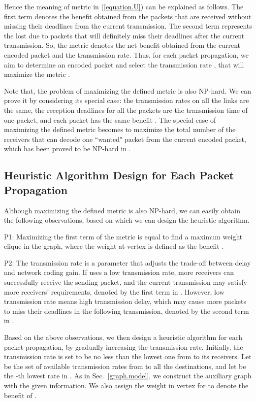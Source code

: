 \documentclass[journal]{IEEEtran}
\begin{document}
Hence the meaning of metric  in (\ref{equation.U}) can be explained as follows.
The first term  denotes the benefit obtained from the packets that are received without missing their deadlines from the current transmission. The second term  represents the lost due to packets that will definitely miss their deadlines after the current transmission. So, the metric  denotes the net benefit obtained from the current encoded packet and the transmission rate.
Thus, for each packet propagation, we aim to determine an encoded packet and select the transmission rate , that will maximize the metric .

Note that, the problem of maximizing the defined metric  is also NP-hard. We can prove it by considering its special case: the transmission rates on all the links are the same,  the reception deadlines for all the packets are the transmission time of one packet, and each packet has the same benefit . The special case of maximizing the defined metric  becomes to maximize the total number of the receivers that can decode one ``wanted" packet from the current encoded packet, which has been proved to be NP-hard in \cite{XiuminWang2010}.

\vspace{-0.1in}
\subsection{Heuristic Algorithm Design for Each Packet Propagation}\label{Sec.algorithm.design}
Although maximizing the defined metric  is also NP-hard, we can easily obtain the following observations, based on which we can design the heuristic algorithm.

P1: Maximizing the first term of the metric  is equal to find a maximum weight clique in the graph, where the weight at vertex  is defined as the benefit .

P2: The transmission rate is a parameter that adjusts the trade-off between delay and network coding gain. If  uses a low transmission rate, more receivers can successfully receive the sending packet, and the current transmission may satisfy more receivers' requirements, denoted by the first term in . However, low transmission rate means high transmission delay, which may cause more packets to miss their deadlines in the following transmission, denoted by the second term in .

Based on the above observations, we then design a heuristic algorithm for each packet propagation, by gradually increasing the transmission rate. Initially, the transmission rate is set to be no less than the lowest one from  to its receivers. Let  be the set of available transmission rates from  to all the destinations, and let  be the -th lowest rate in . As in Sec.~\ref{graph.model}, we construct the auxiliary graph with the given information. We also assign the weight  in vertex  for  to denote the benefit of .
\end{document}
